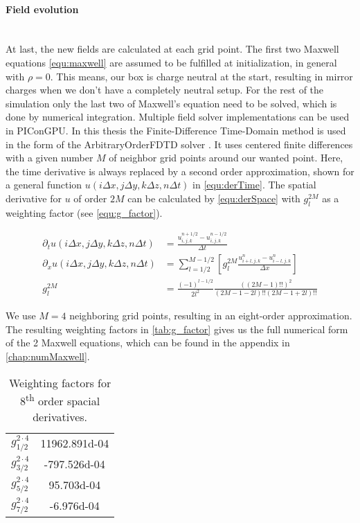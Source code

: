 \documentclass[bachelor_thesis]{subfiles}
\begin{document}
\paragraph*{Field evolution}\hspace{0pt} \\
At last, the new fields are calculated at each grid point. The first two Maxwell equations \autoref{equ:maxwell} are assumed to be fulfilled at initialization, in general with $\rho=0$. This means, our box is charge neutral at the start, resulting in mirror charges when we don't have a completely neutral setup.
For the rest of the simulation only the last two of Maxwell's equation need to be solved, which is done by numerical integration. 
Multiple field solver implementations can be used in PIConGPU. In this thesis the Finite-Difference Time-Domain method is used in the form of the ArbitraryOrderFDTD solver \cite{PICRepo}. It uses centered finite differences with a given number $M$ of neighbor grid points around our wanted point.
Here, the time derivative is always replaced by a second order approximation, shown for a general function $u(i\Delta x,j\Delta y,k\Delta z,n\Delta t)$ in \autoref{equ:derTime}. The spatial derivative for $u$ of order $2M$ can be calculated by \autoref{equ:derSpace} \cite{PICRepo} with $g_l^{2M}$ as a weighting factor (see \autoref{equ:g_factor}).

\begin{align}
\partial_t u(i\Delta x,j\Delta y,k\Delta z,n\Delta t) &= \frac{u_{i,j,k}^{n+1/2} - u_{i,j,k}^{n-1/2}}{\Delta t}								\label{equ:derTime}	\\
\partial_x u(i\Delta x,j\Delta y,k\Delta z,n\Delta t) &=  \sum\limits_{l=1/2}^{M-1/2} \left[ g^{2M}_l \frac{u_{i + l, j, k}^n - u_{i - l, j, k}^n}{\Delta x} \right] 	\label{equ:derSpace}	\\
g^{2M}_l &= \frac{(-1)^{l-1/2}}{2l^2} \frac{((2M-1)!!)^2}{(2M -1 - 2l)!! (2M -1 + 2l)!!}											\label{equ:g_factor}
\end{align}

We use $M=4$ neighboring grid points, resulting in an eight-order approximation. The resulting weighting factors in \autoref{tab:g_factor} gives us the full numerical form of the 2 Maxwell equations, which can be found in the appendix in \autoref{chap:numMaxwell}.
\begin{table}[h]
\begin{center}
\begin{tabular}{ |c|c| }
	\hline
	$g_{1/2}^{2\cdot 4}$ & \num{11962.891d-04} \\ 
	$g_{3/2}^{2\cdot 4}$ & \num{-797.526d-04} \\  
	$g_{5/2}^{2\cdot 4}$ & \num{95.703d-04} \\	
	$g_{7/2}^{2\cdot 4}$ & \num{-6.976d-04} \\
	 \hline
\end{tabular}
\caption{Weighting factors for 8\textsuperscript{th} order spacial derivatives.}\label{tab:g_factor}
\end{center}
\end{table}
\end{document}
